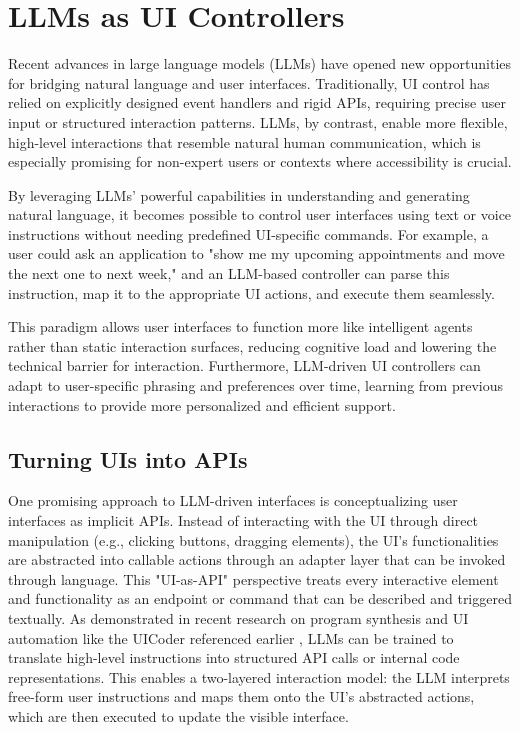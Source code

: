 \documentclass[openany]{book}
\begin{document}
\section{LLMs as UI Controllers}
Recent advances in large language models (LLMs) have opened new opportunities for bridging natural language and user interfaces. Traditionally, UI control has relied on explicitly designed event handlers and rigid APIs, requiring precise user input or structured interaction patterns. LLMs, by contrast, enable more flexible, high-level interactions that resemble natural human communication, which is especially promising for non-expert users or contexts where accessibility is crucial.

By leveraging LLMs' powerful capabilities in understanding and generating natural language, it becomes possible to control user interfaces using text or voice instructions without needing predefined UI-specific commands. For example, a user could ask an application to "show me my upcoming appointments and move the next one to next week," and an LLM-based controller can parse this instruction, map it to the appropriate UI actions, and execute them seamlessly.

This paradigm allows user interfaces to function more like intelligent agents rather than static interaction surfaces, reducing cognitive load and lowering the technical barrier for interaction. Furthermore, LLM-driven UI controllers can adapt to user-specific phrasing and preferences over time, learning from previous interactions to provide more personalized and efficient support.

\subsection{Turning UIs into APIs}
One promising approach to LLM-driven interfaces is conceptualizing user interfaces as implicit APIs. Instead of interacting with the UI through direct manipulation (e.g., clicking buttons, dragging elements), the UI's functionalities are abstracted into callable actions through an adapter layer that can be invoked through language.
This "UI-as-API" perspective treats every interactive element and functionality as an endpoint or command that can be described and triggered textually. As demonstrated in recent research on program synthesis and UI automation like the UICoder referenced earlier \cite{Wu2024, mobileui}, LLMs can be trained to translate high-level instructions into structured API calls or internal code representations. This enables a two-layered interaction model: the LLM interprets free-form user instructions and maps them onto the UI's abstracted actions, which are then executed to update the visible interface.
\end{document}
